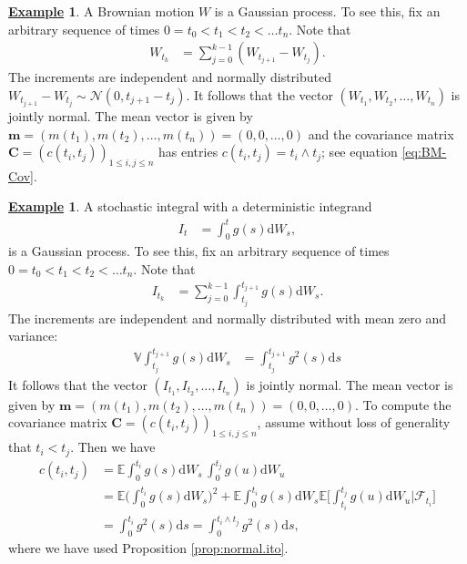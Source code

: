 \documentclass[12pt]{book}
\numberwithin{equation}{chapter}
\theoremstyle{plain}
\numberwithin{theorem}{section}
\theoremstyle{definition}
\newtheorem{example}[theorem]{\underline{Example}}
\numberwithin{exercise}{chapter}
\newcommand{\<}{\langle}
\renewcommand{\>}{\rangle}
\renewcommand{\(}{\left(}
\renewcommand{\)}{\right)}
\renewcommand{\[}{\left[}
\renewcommand{\]}{\right]}
\newcommand\Eb{\mathds{E}}
\newcommand\Vb{\mathds{V}}
\newcommand\Fc{\mathscr{F}}
\newcommand\Nc{\mathscr{N}}
\newcommand\Cv{\pmb{C}}
\newcommand\mv{\pmb{m}}
\newcommand\dd{\mathrm{d}}
\begin{document}
\begin{example}
\label{eq:bm.gaussian}
A Brownian motion $W$ is a Gaussian process.  To see this, fix an arbitrary sequence of times $0=t_0 < t_1 < t_2 < \ldots t_n$.  Note that
\begin{align}
W_{t_k}
	&=	\sum_{j=0}^{k-1} ( W_{t_{j+1}} - W_{t_j} ) .
\end{align}
The increments are independent and normally distributed $W_{t_{j+1}} - W_{t_j} \sim \Nc(0,t_{j+1}-t_j)$.  It follows that the vector $(W_{t_1},W_{t_2},\ldots,W_{t_n})$ is jointly normal.  The mean vector is given by $\mv = (m(t_1),m(t_2),\ldots,m(t_n)) = (0,0,\ldots,0)$ and the covariance matrix $\Cv = (c(t_i,t_j))_{1 \leq i,j \leq n}$ has entries $c(t_i,t_j) = t_i \wedge t_j$; see equation \eqref{eq:BM-Cov}.
\end{example}

\begin{example}
\label{eq:ito.gaussian}
A stochastic integral with a deterministic integrand
\begin{align}
I_t
	&=	\int_0^t g(s) \dd W_s ,
\end{align}
is a Gaussian process.  To see this, fix an arbitrary sequence of times $0=t_0 < t_1 < t_2 < \ldots t_n$.  Note that
\begin{align}
I_{t_k}
	&=	\sum_{j=0}^{k-1} \int_{t_j}^{t_{j+1}} g(s) \dd W_s .
\end{align}
The increments are independent and normally distributed with mean zero and variance:
\begin{align}
\Vb \int_{t_j}^{t_{j+1}} g(s) \dd W_s
	&=	\int_{t_j}^{t_{j+1}} g^2(s) \dd s
\end{align}
It follows that the vector $(I_{t_1},I_{t_2},\ldots,I_{t_n})$ is jointly normal.  The mean vector is given by $\mv = (m(t_1),m(t_2),\ldots,m(t_n)) = (0,0,\ldots,0)$.  To compute the covariance matrix $\Cv = (c(t_i,t_j))_{1 \leq i,j \leq n}$, assume without loss of generality that $t_i < t_j$.  Then we have 
\begin{align}
c(t_i,t_j) 
	&=  \Eb \int_0^{t_i}g(s) \dd W_s \, \int_0^{t_j} g(u)  \dd W_u \\
	&=	\Eb \Big( \int_0^{t_i} g(s) \dd W_s \Big)^2 + \Eb \int_0^{t_i} g(s) \dd W_s \Eb \Big[ \int_{t_i}^{t_j} g(u) \dd W_u \Big| \Fc_{t_i} \Big] \\
	&=	\int_0^{t_i} g^2(s) \dd s
	=		\int_0^{t_i \wedge t_j} g^2(s) \dd s ,
\end{align}
where we have used Proposition \ref{prop:normal.ito}.
\end{example}
\end{document}
